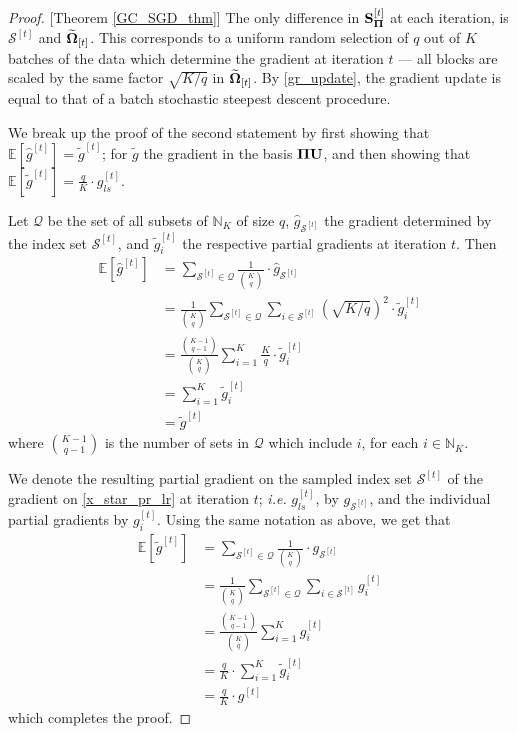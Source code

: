 \documentclass[journal,letterpaper,onecolumn,twoside,nofonttune]{IEEEtran}
\newcommand{\Qcal}{\mathcal{Q}}
\newcommand{\Ub}{\bold{U}}
\newcommand{\Pibold}{\bold{\Pi}}
\newcommand{\Omb}{\bold{\Omega}}
\newcommand{\Ombwt}{\widetilde{\Omb}}
\newcommand{\Scal}{\mathcal{S}}
\newcommand{\E}{\mathbb{E}}
\newcommand{\N}{\mathbb{N}}
\newcommand{\gt}{\tilde{g}}
\newcommand{\gh}{\hat{g}}
\newcommand{\Sb}{\bold{S}}
\newcommand{\SbPi}{\Sb_{\Pibold}}
\begin{document}
\begin{proof}{[Theorem \ref{GC_SGD_thm}]}
The only difference in $\SbPi^{[t]}$ at each iteration, is $\Scal^{[t]}$ and $\Ombwt_{[t]}$. This corresponds to a uniform random selection of $q$ out of $K$ batches of the data which determine the gradient at iteration $t$ --- all blocks are scaled by the same factor $\sqrt{K/q}$ in $\Ombwt_{[t]}$. By \eqref{gr_update}, the gradient update is equal to that of a batch stochastic steepest descent procedure.

We break up the proof of the second statement by first showing that $\E\left[\gh^{[t]}\right]=\gt^{[t]}$; for $\gt$ the gradient in the basis $\Pibold\Ub$, and then showing that $\E\left[\gt^{[t]}\right]=\frac{q}{K}\cdot g_{ls}^{[t]}$.

Let $\Qcal$ be the set of all subsets of $\N_K$ of size $q$, $\gh_{\Scal^{[t]}}$ the gradient determined by the index set $\Scal^{[t]}$, and $\gt_i^{[t]}$ the respective partial gradients at iteration $t$. Then
\begin{align*}
  \E\left[\gh^{[t]}\right] &= \sum_{\Scal^{[t]}\in\Qcal}\frac{1}{{K\choose q}}\cdot\gh_{\Scal^{[t]}}\\
  &= \frac{1}{{K\choose q}}\sum_{\Scal^{[t]}\in\Qcal}\sum_{i\in\Scal^{[t]}}{\left(\sqrt{K/q}\right)^2}\cdot\gt_i^{[t]}\\
  &= \frac{{K-1\choose q-1}}{{K\choose q}}\sum_{i=1}^K\frac{K}{q}\cdot\gt_i^{[t]}\\
  &= \sum_{i=1}^K\gt_i^{[t]}\\
  &= \gt^{[t]}
\end{align*}
where ${K-1\choose q-1}$ is the number of sets in $\Qcal$ which include $i$, for each $i\in\N_K$.

We denote the resulting partial gradient on the sampled index set $\Scal^{[t]}$ of the gradient on \eqref{x_star_pr_lr} at iteration $t$; \textit{i.e.} $g_{ls}^{[t]}$, by $g_{\Scal^{[t]}}$, and the individual partial gradients by $g_i^{[t]}$. Using the same notation as above, we get that
\begin{align*}
  \E\left[\gt^{[t]}\right] &= \sum_{\Scal^{[t]}\in\Qcal}\frac{1}{{K\choose q}}\cdot g_{\Scal^{[t]}}\\
  &= \frac{1}{{K\choose q}}\sum_{\Scal^{[t]}\in\Qcal}\sum_{i\in\Scal^{[t]}}g_i^{[t]}\\
  &= \frac{{K-1\choose q-1}}{{K\choose q}}\sum_{i=1}^Kg_i^{[t]}\\
  &= \frac{q}{K}\cdot\sum_{i=1}^K\gt_i^{[t]}\\
  &= \frac{q}{K}\cdot g^{[t]}
\end{align*}
which completes the proof.
\end{proof}
\end{document}
